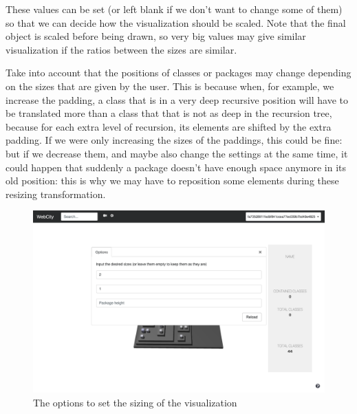 \documentclass[]{usiinfbachelorproject}
\begin{document}
These values can be set (or left blank if we don't want to change some of them) so that we can decide how the visualization should be scaled. Note that the final object is scaled before being drawn, so very big values may give similar visualization if the ratios between the sizes are similar.

Take into account that the positions of classes or packages may change depending on the sizes that are given by the user. This is because when, for example, we increase the padding, a class that is in a very deep recursive position will have to be translated more than a class that that is not as deep in the recursion tree, because for each extra level of recursion, its elements are shifted by the extra padding. If we were only increasing the sizes of the paddings, this could be fine: but if we decrease them, and maybe also change the settings at the same time, it could happen that suddenly a package doesn't have enough space anymore in its old position: this is why we may have to reposition some elements during these resizing transformation.

\begin{figure} [H]
\centering
\includegraphics[width=1\textwidth]{pictures/sizing_card.png}
\caption{The options to set the sizing of the visualization}
\label{fig:sizing}
\end{figure}
\end{document}
